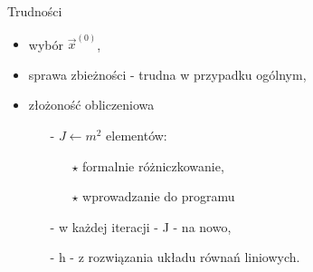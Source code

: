 \begin{frame}{}
  \begin{block}{Trudności}
    \begin{itemize}
      \item wybór $\overrightarrow{x}^{(0)}$,
      \item sprawa zbieżności - trudna w przypadku ogólnym,
      \item złożoność obliczeniowa
      \begin{itemize}
        \item[-] $J\leftarrow m^2$ elementów:
        \begin{itemize}
          \item[$\star$] formalnie różniczkowanie,
          \item[$\star$] wprowadzanie do programu
        \end{itemize}
        \item[-] w każdej iteracji - J - na nowo,
        \item[-] h - z rozwiązania układu równań liniowych.
      \end{itemize}
    \end{itemize}
  \end{block}
\end{frame}

